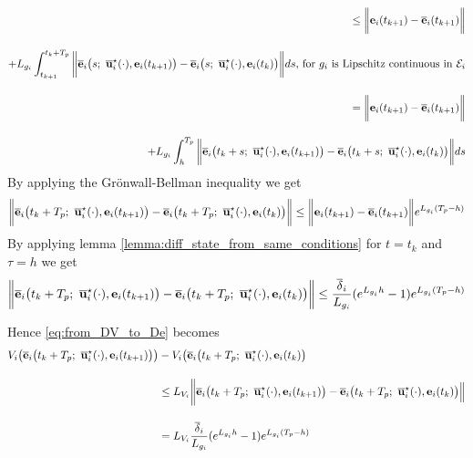 \begin{gg_box}
\begin{alignat}{2}
  \leq \bigg \| \vect{e}_i(t_{k+1}) - \overline{\vect{e}}_i(t_{k+1}) \bigg\| \\[2.5ex]
  +  L_{g_i} \int_{t_{k+1}}^{t_k + T_p} \bigg\| \overline{\vect{e}}_i\big(s;\ \overline{\vect{u}}_i^{\star}(\cdot), \vect{e}_i(t_{k+1})\big)
  - \overline{\vect{e}}_i\big(s;\ \overline{\vect{u}}_i^{\star}(\cdot), \vect{e}_i(t_k)\big) \bigg\| ds \text{, for } g_i \text{ is Lipschitz continuous in } \mathcal{E}_i\\[2.5ex]
  = \bigg \| \vect{e}_i(t_{k+1}) - \overline{\vect{e}}_i(t_{k+1}) \bigg\| \\[2.5ex]
  +  L_{g_i} \int_{h}^{T_p} \bigg\| \overline{\vect{e}}_i\big(t_k + s;\ \overline{\vect{u}}_i^{\star}(\cdot), \vect{e}_i(t_{k+1})\big)
  - \overline{\vect{e}}_i\big(t_k + s;\ \overline{\vect{u}}_i^{\star}(\cdot), \vect{e}_i(t_k)\big) \bigg\| ds
\end{alignat}
By applying the  Gr\"{o}nwall-Bellman inequality we get
\begin{alignat}{2}
  \bigg \|\overline{\vect{e}}_i\big(t_k + T_p;\ \overline{\vect{u}}_i^{\star}(\cdot), \vect{e}_i(t_{k+1})\big)
    - \overline{\vect{e}}_i\big(t_k + T_p;\ \overline{\vect{u}}_i^{\star}(\cdot), \vect{e}_i(t_k)\big) \bigg\|
    \leq \bigg \| \vect{e}_i(t_{k+1}) - \overline{\vect{e}}_i(t_{k+1}) \bigg\| e^{L_{g_i} (T_p - h)}
\end{alignat}
By applying lemma \eqref{lemma:diff_state_from_same_conditions} for $t = t_k$ and
$\tau = h$ we get
\begin{alignat}{2}
  \bigg \|\overline{\vect{e}}_i\big(t_k + T_p;\ \overline{\vect{u}}_i^{\star}(\cdot), \vect{e}_i(t_{k+1})\big)
    - \overline{\vect{e}}_i\big(t_k + T_p;\ \overline{\vect{u}}_i^{\star}(\cdot), \vect{e}_i(t_k)\big) \bigg\|
    \leq \dfrac{\overline{\delta}_i}{L_{g_i}} (e^{L_{g_i}h} - 1) e^{L_{g_i} (T_p - h)}
\end{alignat}

Hence \eqref{eq:from_DV_to_De} becomes
\begin{align}
  V_i\big(\overline{\vect{e}}_i\big(t_k + T_p;\ \overline{\vect{u}}_i^{\star}(\cdot), \vect{e}_i(t_{k+1})\big)\big)
    &- V_i\big(\overline{\vect{e}}_i\big(t_k + T_p;\ \overline{\vect{u}}_i^{\star}(\cdot), \vect{e}_i(t_k)\big) \\[2.5ex]
  &\leq L_{V_i}\bigg \| \overline{\vect{e}}_i\big(t_k + T_p;\ \overline{\vect{u}}_i^{\star}(\cdot), \vect{e}_i(t_{k+1})\big)
    - \overline{\vect{e}}_i\big(t_k + T_p;\ \overline{\vect{u}}_i^{\star}(\cdot), \vect{e}_i(t_k) \big)\Big\| \\[2.5ex]
  &= L_{V_i} \dfrac{\overline{\delta}_i}{L_{g_i}} (e^{L_{g_i}h} - 1) e^{L_{g_i} (T_p - h)}
\label{eq:from_DV_to_eq}
\end{align}


\end{gg_box}

